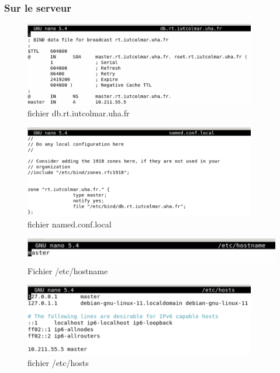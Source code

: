 \documentclass[12pt, a4paper]{article}
\begin{document}
        \subsubsection{Sur le serveur}
        \begin{figure}[H]
            \centering
            \includegraphics[width=0.9\textwidth]{../img/db.png}
            \caption{fichier db.rt.iutcolmar.uha.fr}
            \label{fig:db}
        \end{figure}
        \begin{figure}[H]
            \centering
            \includegraphics[width=0.9\textwidth]{../img/named.png}
            \caption{fichier named.conf.local}
            \label{fig:named}
        \end{figure}
        \begin{figure}[H]
            \centering
            \includegraphics[width=1\textwidth]{../img/hostname.png}
            \caption{Fichier /etc/hostname}
            \label{fig:hostname}
        \end{figure}
        \begin{figure}[H]
            \centering
            \includegraphics[width=0.9\textwidth]{../img/hosts.png}
            \caption{fichier /etc/hosts}
            \label{fig:hosts}
        \end{figure}
\end{document}
